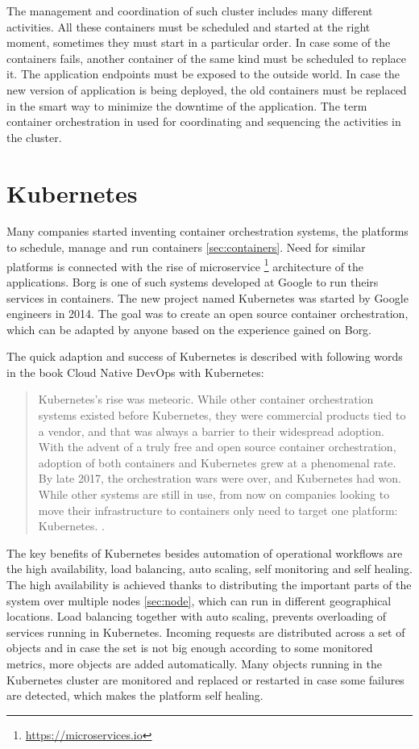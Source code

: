 \documentclass[
  digital, %
  twoside, %
  table,   %
  lof,     %
  lot,     %
]{fithesis3}
\begin{document}
The management and coordination of such cluster includes many different activities. All these containers must be scheduled and started at the right moment, sometimes they must start in a particular order. In case some of the containers fails, another container of the same kind must be scheduled to replace it. The application endpoints must be exposed to the outside world. In case the new version of application is being deployed, the old containers must be replaced in the smart way to minimize the downtime of the application. The term container orchestration in used for coordinating and sequencing the activities in the cluster.

\section{Kubernetes} \label{sec:k8s}
Many companies started inventing container orchestration systems, the platforms to schedule, manage and run containers \ref{sec:containers}. Need for similar platforms is connected with the rise of microservice \footnote{\url{https://microservices.io}} architecture of the applications. Borg \cite{borg} is one of such systems developed at Google to run theirs services in containers. The new project named Kubernetes was started by Google engineers in 2014. The goal was to create an open source container orchestration, which can be adapted by anyone based on the experience gained on Borg.

The quick adaption and success of Kubernetes is described with following words in the book Cloud Native DevOps with Kubernetes:
\begin{quote}
Kubernetes’s rise was meteoric. While other container orchestration systems existed
before Kubernetes, they were commercial products tied to a vendor, and that was
always a barrier to their widespread adoption. With the advent of a truly free and
open source container orchestration, adoption of both containers and Kubernetes grew
at a phenomenal rate.
By late 2017, the orchestration wars were over, and Kubernetes had won. While other
systems are still in use, from now on companies looking to move their infrastructure
to containers only need to target one platform: Kubernetes. \cite[p. 11]{k8s}.
\end{quote}

The key benefits of Kubernetes \cite{k8s_features} besides automation of operational workflows are the high availability, load balancing, auto scaling, self monitoring and self healing. The high availability is achieved thanks to distributing the important parts of the system over multiple nodes \ref{sec:node}, which can run in different geographical locations. Load balancing together with auto scaling, prevents overloading of services running in Kubernetes. Incoming requests are distributed across a set of objects and in case the set is not big enough according to some monitored metrics, more objects are added automatically. Many objects running in the Kubernetes cluster are monitored and replaced or restarted in case some failures are detected, which makes the platform self healing.
\end{document}
